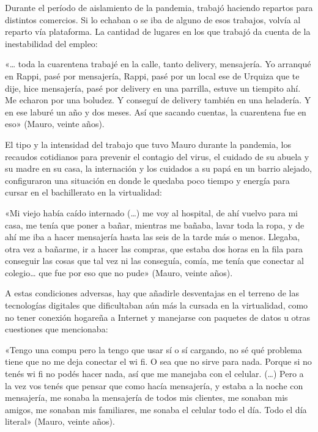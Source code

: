\begin{refsection}
\begin{gbcita}
\end{gbcita}

Durante el período de aislamiento de la pandemia, trabajó haciendo repartos para distintos comercios. Si lo echaban o se iba de alguno de esos trabajos, volvía al reparto vía plataforma. La cantidad de lugares en los que trabajó da cuenta de la inestabilidad del empleo:


\begin{gbcita}
«… toda la cuarentena trabajé en la calle, tanto delivery, mensajería. Yo arranqué en Rappi, pasé por mensajería, Rappi, pasé por un local ese de Urquiza que te dije, hice mensajería, pasé por delivery en una parrilla, estuve un tiempito ahí. Me echaron por una boludez. Y conseguí de delivery también en una heladería. Y en ese laburé un año y dos meses. Así que sacando cuentas, la cuarentena fue en eso» (Mauro, veinte años).

\end{gbcita}

El tipo y la intensidad del trabajo que tuvo Mauro durante la pandemia, los recaudos cotidianos para prevenir el contagio del virus, el cuidado de su abuela y su madre en su casa, la internación y los cuidados a su papá en un barrio alejado, configuraron una situación en donde le quedaba poco tiempo y energía para cursar en el bachillerato en la virtualidad:


\begin{gbcita}
«Mi viejo había caído internado (…) me voy al hospital, de ahí vuelvo para mi casa, me tenía que poner a bañar, mientras me bañaba, lavar toda la ropa, y de ahí me iba a hacer mensajería hasta las seis de la tarde más o menos. Llegaba, otra vez a bañarme, ir a hacer las compras, que estaba dos horas en la fila para conseguir las cosas que tal vez ni las conseguía, comía, me tenía que conectar al colegio… que fue por eso que no pude» (Mauro, veinte años).

\end{gbcita}

A estas condiciones adversas, hay que añadirle desventajas en el terreno de las tecnologías digitales que dificultaban aún más la cursada en la virtualidad, como no tener conexión hogareña a Internet y manejarse con paquetes de datos u otras cuestiones que mencionaba:


\begin{gbcita}
«Tengo una compu pero la tengo que usar sí o sí cargando, no sé qué problema tiene que no me deja conectar el wi fi. O sea que no sirve para nada. Porque si no tenés wi fi no podés hacer nada, así que me manejaba con el celular. (…) Pero a la vez vos tenés que pensar que como hacía mensajería, y estaba a la noche con mensajería, me sonaba la mensajería de todos mis clientes, me sonaban mis amigos, me sonaban mis familiares, me sonaba el celular todo el día. Todo el día literal» (Mauro, veinte años).


\end{gbcita}
\end{refsection}
